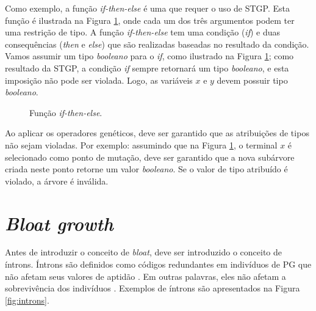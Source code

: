 Como exemplo, a função \textit{if-then-else} é uma que requer o uso de STGP. Esta função é ilustrada na Figura \ref{fig:stgp-example}, onde cada um dos três argumentos podem ter uma restrição de tipo. A função \textit{if-then-else} tem uma condição (\textit{if}) e duas consequências (\textit{then} e \textit{else}) que são realizadas baseadas no resultado da condição. Vamos assumir um tipo \textit{booleano} para o \textit{if}, como ilustrado na Figura \ref{fig:stgp-example}; como resultado da STGP, a condição \textit{if} sempre retornará um tipo \textit{booleano}, e esta imposição não pode ser violada. Logo, as variáveis $x$ e $y$ devem possuir tipo \textit{booleano}.

\begin{figure}[H]
    \caption{Função \textit{if-then-else}.}
    \label{fig:stgp-example}
    \begin{center}
    \end{center}
    \begin{center}
    \end{center}
\end{figure}

Ao aplicar os operadores genéticos, deve ser garantido que as atribuições de tipos não sejam violadas. Por exemplo: assumindo que na Figura \ref{fig:stgp-example}, o terminal $x$ é selecionado como ponto de mutação, deve ser garantido que a nova subárvore criada neste ponto retorne um valor \textit{booleano}. Se o valor de tipo atribuído é violado, a árvore é inválida.

\section{\textit{Bloat growth}} \label{sec:bloat-growth}
Antes de introduzir o conceito de \textit{bloat}, deve ser introduzido o conceito de íntrons. Íntrons são definidos como códigos redundantes em indivíduos de PG que não afetam seus valores de aptidão \cite{poli2008}. Em outras palavras, eles não afetam a sobrevivência dos indivíduos \cite{banzhaf1998}. Exemplos de íntrons são apresentados na Figura \ref{fig:introns}.

